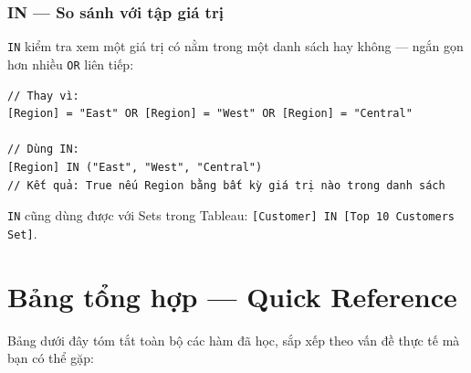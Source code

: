 \documentclass[12pt]{article}
\begin{document}
\subsubsection{IN --- So sánh với tập giá trị}

\noindent \texttt{IN} kiểm tra xem một giá trị có nằm trong một danh sách hay không --- ngắn gọn hơn nhiều \texttt{OR} liên tiếp:

\begin{aivncodebox}[]
\begin{lstlisting}
// Thay vì:
[Region] = "East" OR [Region] = "West" OR [Region] = "Central"

// Dùng IN:
[Region] IN ("East", "West", "Central")
// Kết quả: True nếu Region bằng bất kỳ giá trị nào trong danh sách
\end{lstlisting}
\end{aivncodebox}

\noindent \texttt{IN} cũng dùng được với Sets trong Tableau: \texttt{[Customer] IN [Top 10 Customers Set]}.

\section{Bảng tổng hợp --- Quick Reference}

\noindent Bảng dưới đây tóm tắt toàn bộ các hàm đã học, sắp xếp theo vấn đề thực tế mà bạn có thể gặp:
\end{document}
